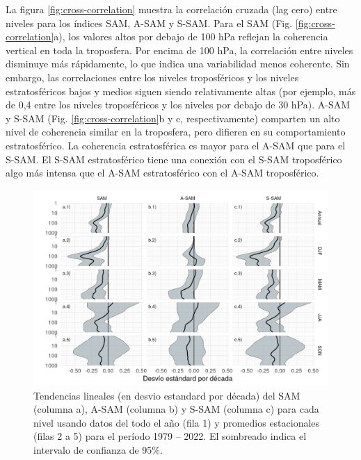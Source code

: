 \documentclass[12pt,oneside]{reedthesis}
\begin{document}
La figura \ref{fig:cross-correlation} muestra la correlación cruzada (lag cero) entre niveles para los índices SAM, A-SAM y S-SAM.
Para el SAM (Fig. \ref{fig:cross-correlation}a), los valores altos por debajo de 100 hPa reflejan la coherencia vertical en toda la troposfera.
Por encima de 100 hPa, la correlación entre niveles disminuye más rápidamente, lo que indica una variabilidad menos coherente.
Sin embargo, las correlaciones entre los niveles troposféricos y los niveles estratosféricos bajos y medios siguen siendo relativamente altas (por ejemplo, más de 0,4 entre los niveles troposféricos y los niveles por debajo de 30 hPa).
A-SAM y S-SAM (Fig. \ref{fig:cross-correlation}b y c, respectivamente) comparten un alto nivel de coherencia similar en la troposfera, pero difieren en su comportamiento estratosférico.
La coherencia estratosférica es mayor para el A-SAM que para el S-SAM.
El S-SAM estratosférico tiene una conexión con el S-SAM troposférico algo más intensa que el A-SAM estratosférico con el A-SAM troposférico.




\begin{figure}
\includegraphics{figures/30-sam/trends-1} \caption{Tendencias lineales (en desvio estandard por década) del SAM (columna a), A-SAM (columna b) y S-SAM (columna c) para cada nivel usando datos del todo el año (fila 1) y promedios estacionales (filas 2 a 5) para el período 1979 -- 2022.
El sombreado indica el intervalo de confianza de 95\%.}\label{fig:trends}
\end{figure}

\end{document}
